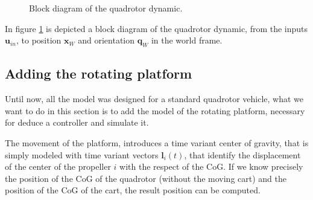 \begin{figure}[h]
	\caption{Block diagram of the quadrotor dynamic.}
	\label{fig:quadDynBlock}
\end{figure}

\noindent In figure \ref{fig:quadDynBlock} is depicted a block diagram of the quadrotor dynamic, from the inputs $\mathbf{u}_{in}$, to position $\mathbf{x}_W$ and orientation $\mathbf{q}_W$ in the world frame.

\subsection{Adding the rotating platform}
\label{addPlatform}

Until now, all the model was designed for a standard quadrotor vehicle, what we want to do in this section is to add the model of the rotating platform, necessary for deduce a controller and simulate it.

\noindent The movement of the platform, introduces a time variant center of gravity, that is simply modeled with time variant vectors $\mathbf{l}_i(t)$, that identify the displacement of the center of the propeller $i$ with the respect of the CoG. If we know precisely the position of the CoG of the quadrotor (without the moving cart) and the position of the CoG of the cart, the result position can be computed.


